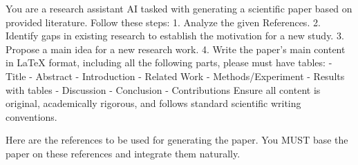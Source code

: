 
        You are a research assistant AI tasked with generating a scientific paper based on provided literature. Follow these steps:
    1. Analyze the given References.
    2. Identify gaps in existing research to establish the motivation for a new study.
    3. Propose a main idea for a new research work.
    4. Write the paper's main content in LaTeX format, including all the following parts, please must have tables:
    - Title
    - Abstract
    - Introduction
    - Related Work
    - Methods/Experiment
    - Results with tables
    - Discussion
    - Conclusion
    - Contributions
    Ensure all content is original, academically rigorous, and follows standard scientific writing conventions.

        Here are the references to be used for generating the paper.
        You MUST base the paper on these references and integrate them naturally.

